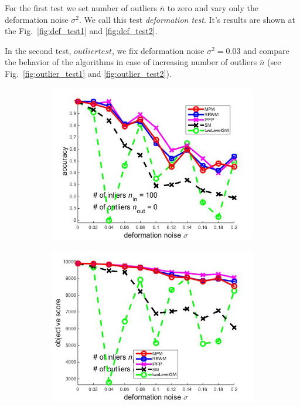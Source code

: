 \documentclass[
	fontsize=12pt,
	paper=a4,
	twoside=false,
	numbers=noenddot,
	plainheadsepline,
	toc=listof,
	toc=bibliography
]{scrartcl}
\begin{document}
For the first test we set number of outliers $\bar{n}$ to zero and vary only the deformation noise $\sigma^2$. We call this test \emph{deformation test}. It's results are shown at the Fig.~\ref{fig:def_test1} and \ref{fig:def_test2}.

In the second test, $outlier test$, we fix deformation noise $\sigma^2= 0.03$ and compare the behavior of the algorithms in case of increasing number of outliers $\bar{n}$ (see Fig.~\ref{fig:outlier_test1} and \ref{fig:outlier_test2}). 

\begin{figure}[h] 
	\begin{subfigure}[b]{0.3\textwidth}
		\centering
		\includegraphics[scale=0.25]{"fig_ver2108/syntheticPointSets/deformation_test/accuracy_greedy"} 
	\end{subfigure}%
	\begin{subfigure}[b]{0.3\textwidth}
		\centering
		\includegraphics[scale=0.25]{"fig_ver2108/syntheticPointSets/deformation_test/score_greedy"} 

\end{subfigure}
\end{figure}
\end{document}
